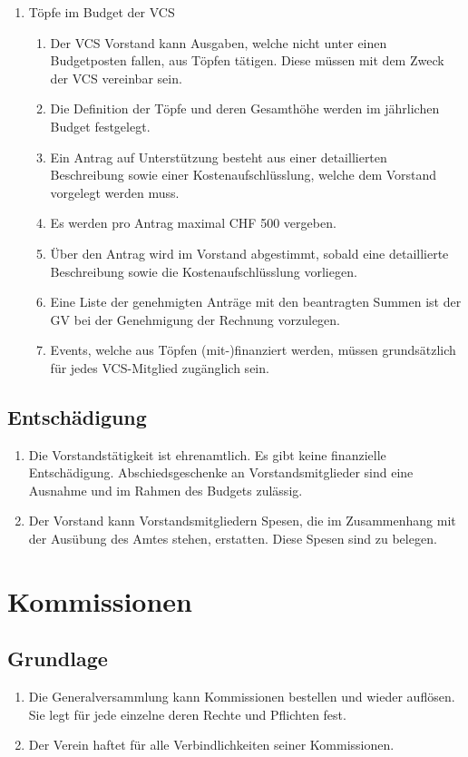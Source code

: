 \begin{enumerate}
 \item Töpfe im Budget der VCS
    \begin{enumerate}
        \item Der VCS Vorstand kann Ausgaben, welche nicht unter einen Budgetposten fallen, aus Töpfen tätigen. Diese müssen mit dem Zweck der VCS vereinbar sein.
        \item Die Definition der Töpfe und deren Gesamthöhe werden im jährlichen Budget festgelegt.
        \item Ein Antrag auf Unterstützung besteht aus einer detaillierten Beschreibung sowie einer Kostenaufschlüsslung, welche dem Vorstand vorgelegt werden muss.
        \item Es werden pro Antrag maximal CHF 500 vergeben.
        \item Über den Antrag wird im Vorstand abgestimmt, sobald eine detaillierte Beschreibung sowie die Kostenaufschlüsslung vorliegen.
        \item Eine Liste der genehmigten Anträge mit den beantragten Summen ist der GV bei der Genehmigung der Rechnung vorzulegen.
        \item Events, welche aus Töpfen (mit-)finanziert werden, müssen grundsätzlich für jedes VCS-Mitglied zugänglich sein.
    \end{enumerate}
\end{enumerate}

\subsection{Entschädigung}
\begin{enumerate}
\item Die Vorstandstätigkeit ist ehrenamtlich. Es gibt keine finanzielle Entschädigung. Abschiedsgeschenke an Vorstandsmitglieder sind eine Ausnahme und im Rahmen des Budgets zulässig.
\item Der Vorstand kann Vorstandsmitgliedern Spesen, die im Zusammenhang mit der Ausübung des Amtes stehen, erstatten. Diese Spesen sind zu belegen.
\end{enumerate}

\section{Kommissionen}

\subsection{Grundlage}
\begin{enumerate}
\item Die Generalversammlung kann Kommissionen bestellen und wieder auflösen. Sie legt für jede einzelne deren Rechte und Pflichten fest.
\item Der Verein haftet für alle Verbindlichkeiten seiner Kommissionen.
\end{enumerate}

